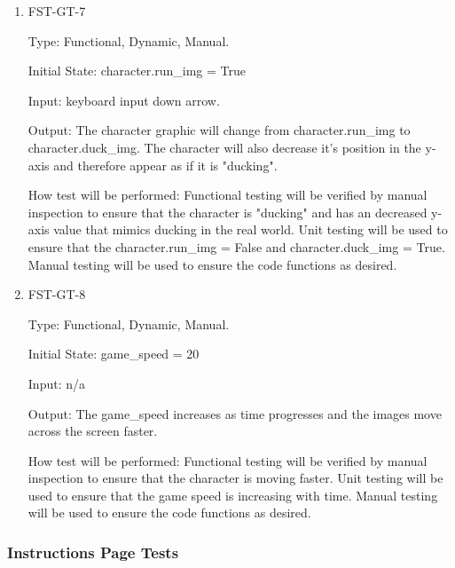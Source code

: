 \documentclass[12pt, titlepage]{article}
\begin{document}
\begin{enumerate}
		\item{FST-GT-7\\}
		
		Type: Functional, Dynamic, Manual.
		
		Initial State: character.run\_img = True
		
		Input: keyboard input down arrow. 
		
		Output: The character graphic will change from character.run\_img to character.duck\_img. The character will also decrease it's position in the y-axis and therefore appear as if it is "ducking". 
		
		How test will be performed: Functional testing will be verified by manual inspection to ensure that the character is "ducking" and has an decreased y-axis value that mimics ducking in the real world. Unit testing will be used to ensure that the character.run\_img = False and character.duck\_img = True. Manual testing will be used to ensure the code functions as desired. 
		
		\item{FST-GT-8\\}
		
		Type: Functional, Dynamic, Manual.
		
		Initial State: game\_speed = 20
		
		Input: n/a
		
		Output: The game\_speed increases as time progresses and the images move across the screen faster. 
		
		How test will be performed: Functional testing will be verified by manual inspection to ensure that the character is moving faster. Unit testing will be used to ensure that the game speed is increasing with time. Manual testing will be used to ensure the code functions as desired. 
		
		
	\end{enumerate}
	
	
	\subsubsection{Instructions Page Tests}
	
\end{document}
